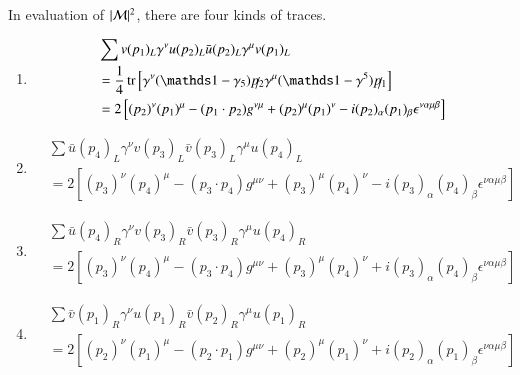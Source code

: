 In evaluation of $|\mathcal{M}|^2$, there are four kinds of traces.
\begin{enumerate}
   \item 
      \begin{align*}
         &\sum v(p_1)_L \gamma^\nu u(p_2)_L \bar{u}(p_2)_L \gamma^\mu v(p_1)_L \\
         &= \frac{1}{4} \tr \left[ \gamma^\nu (\id - \gamma_5) \slashed{p_2} \gamma^\mu (\id - \gamma^5) \slashed{p_1} \right] \\
         &= 2 \left[ (p_2)^\nu (p_1)^\mu - (p_1 \cdot p_2 ) g^{\nu\mu} + (p_2)^\mu (p_1)^\nu - i (p_2)_\alpha (p_1)_\beta \epsilon^{\nu\alpha\mu\beta} \right]
      \end{align*}
   \item 
      \begin{align*}
         &\sum \bar{u}(p_4)_L \gamma^\nu v(p_3)_L \bar{v}(p_3)_L \gamma^\mu u(p_4)_L \\
         &= 2 \left[ (p_3)^\nu (p_4)^\mu - (p_3 \cdot p_4) g^{\mu\nu} + (p_3)^\mu (p_4)^\nu - i (p_3)_\alpha (p_4)_\beta \epsilon^{\nu\alpha\mu\beta} \right]
      \end{align*}
   \item 
      \begin{align*}
         &\sum \bar{u}(p_4)_R \gamma^\nu v(p_3)_R \bar{v}(p_3)_R \gamma^\mu u(p_4)_R \\
         &= 2 \left[ (p_3)^\nu (p_4)^\mu - (p_3 \cdot p_4 )g^{\mu\nu} + (p_3)^\mu (p_4)^\nu + i (p_3)_\alpha (p_4)_\beta \epsilon^{\nu\alpha\mu\beta} \right]
      \end{align*}
   \item 
      \begin{align*}
         &\sum \bar{v}(p_1)_R \gamma^\nu u(p_1)_R \bar{v}(p_2)_R \gamma^\mu u(p_1)_R \\
         &= 2 \left[ (p_2)^\nu (p_1)^\mu - (p_2 \cdot p_1)g^{\mu\nu} + (p_2)^\mu (p_1)^\nu + i (p_2)_\alpha (p_1)_\beta \epsilon^{\nu\alpha\mu\beta} \right]
      \end{align*}
\end{enumerate}


